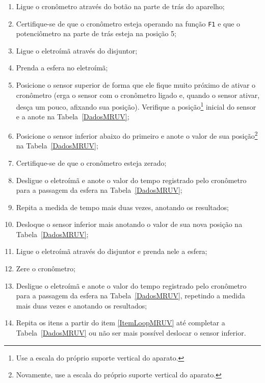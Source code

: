 \begin{enumerate}
    \item Ligue o cronômetro através do botão na parte de trás do aparelho;
    \item Certifique-se de que o cronômetro esteja operando na função \texttt{F1} e que o potenciômetro na parte de trás esteja na posição 5;
    \item Ligue o eletroímã através do disjuntor;
	\item Prenda a esfera no eletroímã;
	\item Posicione o sensor superior de forma que ele fique muito próximo de ativar o cronômetro (erga o sensor com o cronômetro ligado e, quando o sensor ativar, desça um pouco, afixando sua posição). Verifique a posição\footnote{Use a escala do próprio suporte vertical do aparato.} inicial do sensor e a anote na Tabela~\ref{DadosMRUV};
	\item Posicione o sensor inferior  abaixo do primeiro e anote o valor de sua posição\footnote{Novamente, use a escala do próprio suporte vertical do aparato.} na Tabela~\ref{DadosMRUV};
	\item Certifique-se de que o cronômetro esteja zerado;
	\item Desligue o eletroímã e anote o valor do tempo registrado pelo cronômetro para a passagem da esfera na Tabela~\ref{DadosMRUV};
	\item Repita a medida de tempo mais duas vezes, anotando os resultados;
	\item Desloque o sensor inferior mais  anotando o valor de sua nova posição na Tabela~\ref{DadosMRUV};\label{ItemLoopMRUV}
	\item Ligue o eletroímã através do disjuntor e prenda nele a esfera;
	\item Zere o cronômetro;
	\item Desligue o eletroímã e anote o valor do tempo registrado pelo cronômetro para a passagem da esfera na Tabela~\ref{DadosMRUV}, repetindo a medida mais duas vezes e anotando os resultados;
	\item Repita os itens a partir do item \ref{ItemLoopMRUV} até completar a Tabela~\ref{DadosMRUV} ou não ser mais possível deslocar o sensor inferior.
\end{enumerate}

\cleardoublepage

